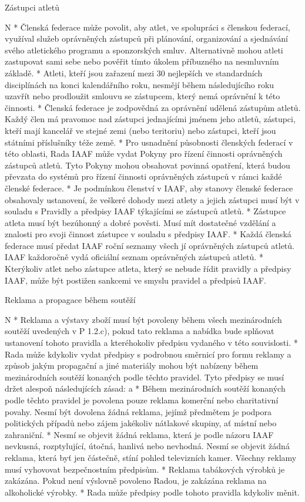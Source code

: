 \secc Zástupci atletů

\begitems \style N
* Členská federace může povolit, aby atlet, ve spolupráci s členskou federací, využíval služeb oprávněných zástupců při plánování, organizování a sjednávání svého atletického programu a sponzorských smluv. Alternativně mohou atleti zastupovat sami sebe nebo pověřit tímto úkolem příbuzného na nesmluvním základě.
* Atleti, kteří jsou zařazení mezi 30 nejlepších ve standardních disciplínách na konci kalendářního roku, nesmějí během následujícího roku uzavřít nebo prodloužit smlouvu se zástupcem, který nemá oprávnění k této činnosti.
* Členská federace je zodpovědná za oprávnění udělená zástupům atletů. Každý člen má pravomoc nad zástupci jednajícími jménem jeho atletů, zástupci, kteří mají kancelář ve stejné zemi (nebo teritoriu) nebo zástupci, kteří jsou státními příslušníky téže země.
* Pro usnadnění působnosti členských federací v této oblasti, Rada IAAF může vydat Pokyny pro řízení činnosti oprávněných zástupců atletů. Tyto Pokyny mohou obsahovat povinná opatření, která budou převzata do systémů pro řízení činnosti oprávněných zástupců v rámci každé členské federace.
* Je podmínkou členství v IAAF, aby stanovy členské federace obsahovaly ustanovení, že veškeré dohody mezi atlety a jejich zástupci musí být v souladu s Pravidly a předpisy IAAF týkajícími se zástupců atletů.
* Zástupce atleta musí být bezúhonný a dobré pověsti. Musí mít dostatečné vzdělání a znalosti pro svoji činnost zástupce v souladu s předpisy IAAF.
* Každá členská federace musí předat IAAF roční seznamy všech jí oprávněných zástupců atletů. IAAF každoročně vydá oficiální seznam oprávněných zástupců atletů.
* Kterýkoliv atlet nebo zástupce atleta, který se nebude řídit pravidly a předpisy IAAF, může být postižen sankcemi ve smyslu pravidel a předpisů IAAF.
\enditems

\secc Reklama a propagace během soutěží

\begitems \style N
* Reklama a výstavy zboží musí být povoleny během všech mezinárodních soutěží uvedených v P 1.2.c), pokud tato reklama a nabídka bude splňovat ustanovení tohoto pravidla a kteréhokoliv předpisu vydaného v této souvislosti.
* Rada může kdykoliv vydat předpisy s podrobnou směrnicí pro formu reklamy a způsob jakým propagační a jiné materiály mohou být nabízeny během mezinárodních soutěží konaných podle těchto pravidel. Tyto předpisy se musí držet alespoň následujících zásad:
  \begitems \style a
  * Během mezinárodních soutěží konaných podle těchto pravidel je povolena pouze reklama komerční nebo charitativní povahy. Nesmí být dovolena žádná reklama, jejímž předmětem je podpora politických případů nebo zájem jakékoliv nátlakové skupiny, ať místní nebo zahraniční.
  * Nesmí se objevit žádná reklama, která je podle názoru IAAF nevkusná, rozptylující, útočná, hanlivá nebo nevhodná. Nesmí se objevit žádná reklama, která byť jen částečně, stíní pohled televizních kamer. Všechny reklamy musí vyhovovat bezpečnostním předpisům.
  * Reklama tabákových výrobků je zakázána. Pokud není výslovně povoleno Radou, je zakázána reklama na alkoholické výrobky.
  \enditems
* Rada může předpisy podle tohoto pravidla kdykoliv měnit.
\enditems

\endinput